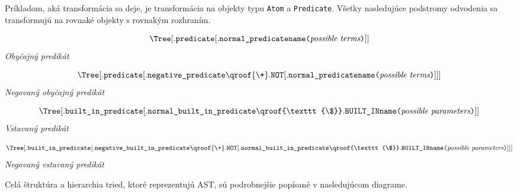 Príkladom, aká transformácia sa deje, je transformácia na objekty typu \texttt{Atom} a \texttt{Predicate}.
Všetky nasledujúce podstromy odvodenia sa transformujú na rovnaké objekty s rovnakým rozhraním.

\begin{center}
    \[
    \Tree
    [.\texttt{predicate} 
        [.\texttt{normal\_predicate}
            \texttt{name}
            \texttt{(}
            \textit{possible terms}
            \texttt{)}
        ]
    ]
    \]
    \textit{Obyčajný predikát}
\end{center}

\begin{center}
    \[
    \Tree
    [.\texttt{predicate}
        [.\texttt{negative\_predicate}
            \qroof{\texttt{\textbackslash+}}.\texttt{NOT}
            [.\texttt{normal\_predicate}
                \texttt{name}
                \texttt{(}
                \textit{possible terms}
                \texttt{)}
            ]
        ]
    ]
    \]
    \textit{Negovaný obyčajný predikát}
\end{center}

\begin{center}
    \[
    \Tree
    [.\texttt{built\_in\_predicate} 
        [.\texttt{normal\_built\_in\_predicate}
            \qroof{\texttt{\$}}.\texttt{BUILT\_IN}
            \texttt{name}
            \texttt{(}
            \textit{possible parameters}
            \texttt{)}
        ]
    ]
    \]
    \textit{Vstavaný predikát}
\end{center}

\begin{center}
    \[
    \Tree
    [.\texttt{built\_in\_predicate}
        [.\texttt{negative\_built\_in\_predicate}
            \qroof{\texttt{\textbackslash+}}.\texttt{NOT}
            [.\texttt{normal\_built\_in\_predicate}
                \qroof{\texttt{\$}}.\texttt{BUILT\_IN}
                \texttt{name}
                \texttt{(}
                \textit{possible parameters}
                \texttt{)}
            ]
        ]
    ]
    \]
    \textit{Negovaný vstavaný predikát}
\end{center}

Celá štruktúra a hierarchia tried, ktoré reprezentujú AST, sú podrobnejšie popísané v nasledujúcom
diagrame.

